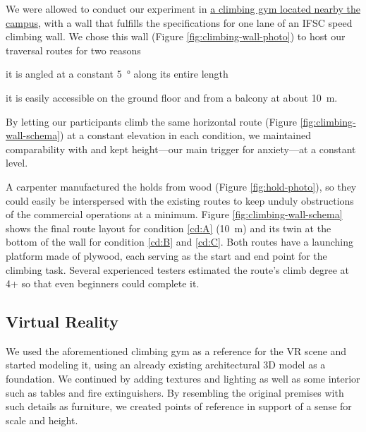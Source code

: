 We were allowed to conduct our experiment in \href{https://www.kletterzentrum-bremen.com/}{a climbing gym located nearby the campus}, with a wall that fulfills the specifications for one lane of an \gls{IFSC} speed climbing wall. We chose this wall (Figure \ref{fig:climbing-wall-photo}) to host our traversal routes for two reasons
\begin{inlinelist}
	\item it is angled at a constant \SI{5}{\degree} along its entire length
	\item it is easily accessible on the ground floor and from a balcony at about \SI{10}{\meter}.
\end{inlinelist}
By letting our participants climb the same horizontal route (Figure \ref{fig:climbing-wall-schema}) at a constant elevation in each condition, we maintained comparability with \textcite{Pijpers2003} and kept height---our main trigger for anxiety---at a constant level. 



A carpenter manufactured the holds from wood (Figure \ref{fig:hold-photo}), so they could easily be interspersed with the existing routes to keep unduly obstructions of the commercial operations at a minimum. Figure \vref{fig:climbing-wall-schema} shows the final route layout for condition \ref{cd:A} (\SI{10}{\meter}) and its twin at the bottom of the wall for condition \ref{cd:B} and \ref{cd:C}. Both routes have a launching platform made of plywood, each serving as the start and end point for the climbing task. Several experienced testers estimated the route's  climb degree at 4+ so that even beginners could complete it. 


\subsection{Virtual Reality}

We used the aforementioned climbing gym as a reference for the \gls{VR} scene and started modeling it, using an already existing architectural 3D model as a foundation. We continued by adding textures and lighting as well as some interior such as tables and fire extinguishers. By resembling the original premises with such details as furniture, we created points of reference in support of a sense for scale and height.

